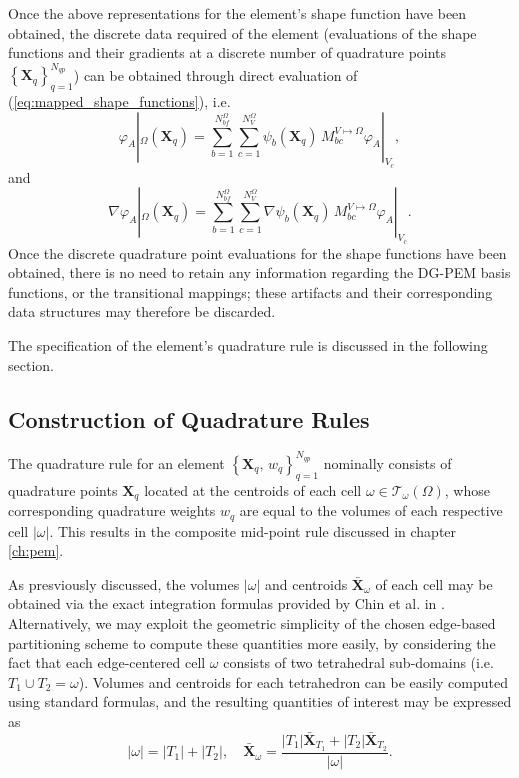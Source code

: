 	Once the above representations for the element's shape function have been obtained, the discrete data required of the element (evaluations of the shape functions and their gradients at a discrete number of quadrature points $\left\{ \mathbf{X}_q \right\}_{q=1}^{N_{qp}}$) can be obtained through direct evaluation of (\ref{eq:mapped_shape_functions}), i.e.
	\begin{equation}
		\varphi_A |_{\Omega} (\mathbf{X}_q) = \sum_{b = 1}^{N^\Omega_{bf}} \sum_{c = 1}^{N^\Omega_{V}} \psi_b (\mathbf{X}_q) \, M^{V \mapsto \Omega}_{bc} \varphi_A |_{V_c},
	\end{equation}
	and
	\begin{equation}
		\nabla \varphi_A |_{\Omega} (\mathbf{X}_q) = \sum_{b = 1}^{N^\Omega_{bf}} \sum_{c = 1}^{N^\Omega_{V}} \nabla \psi_b (\mathbf{X}_q) \, M^{V \mapsto \Omega}_{bc} \varphi_A |_{V_c}.
	\end{equation}
	Once the discrete quadrature point evaluations for the shape functions have been obtained, there is no need to retain any information regarding the DG-PEM basis functions, or the transitional mappings; these artifacts and their corresponding data structures may therefore be discarded.

	The specification of the element's quadrature rule is discussed in the following section.

\subsection*{Construction of Quadrature Rules}

	The quadrature rule for an element $\left\{ \mathbf{X}_q, \, w_q \right\}_{q=1}^{N_{qp}}$ nominally consists of quadrature points $\mathbf{X}_q$ located at the centroids of each cell $\omega \in \mathcal{T}_\omega (\Omega)$, whose corresponding quadrature weights $w_q$ are equal to the volumes of each respective cell $|\omega|$. This results in the composite mid-point rule discussed in chapter \ref{ch:pem}.

	As presviously discussed, the volumes $|\omega|$ and centroids $\bar{\mathbf{X}}_\omega$ of each cell may be obtained via the exact integration formulas provided by Chin et al. in \cite{Chin:15}. Alternatively, we may exploit the geometric simplicity of the chosen edge-based partitioning scheme to compute these quantities more easily, by considering the fact that each edge-centered cell $\omega$ consists of two tetrahedral sub-domains (i.e. $T_1 \cup T_2 = \omega$). Volumes and centroids for each tetrahedron can be easily computed using standard formulas, and the resulting quantities of interest may be expressed as
	\begin{equation}
		|\omega| = |T_1| + |T_2|, \quad \bar{\mathbf{X}}_\omega = \frac{|T_1| \bar{\mathbf{X}}_{T_1} + |T_2| \bar{\mathbf{X}}_{T_2}}{|\omega|}.
	\end{equation}

